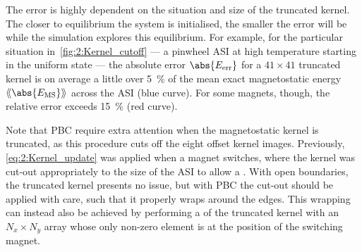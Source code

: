 The error is highly dependent on the situation and size of the truncated kernel.
The closer to equilibrium the system is initialised, the smaller the error will be while the simulation explores this equilibrium.
For example, for the particular situation in~\cref{fig:2:Kernel_cutoff} --- a pinwheel ASI at high temperature starting in the uniform state --- the absolute error $\abs{E_\mathrm{err}}$ for a $41 \times 41$ truncated kernel is on average a little over \SI{5}{\percent} of the mean exact magnetostatic energy $\llangle \abs{E_\mathrm{MS}} \rrangle$ across the ASI (blue curve).
For some magnets, though, the relative error exceeds \SI{15}{\percent} (red curve). \\\par

Note that PBC require extra attention when the magnetostatic kernel is truncated, as this procedure cuts off the eight offset kernel images.
Previously, \cref{eq:2:Kernel_update} was applied when a magnet switches, where the kernel was cut-out appropriately to the size of the ASI to allow a .
With open boundaries, the truncated kernel presents no issue, but with PBC the cut-out should be applied with care, such that it properly wraps around the edges.
This wrapping can instead also be achieved by performing a  of the truncated kernel with an $N_x \times N_y$ array whose only non-zero element is at the position of the switching magnet.


